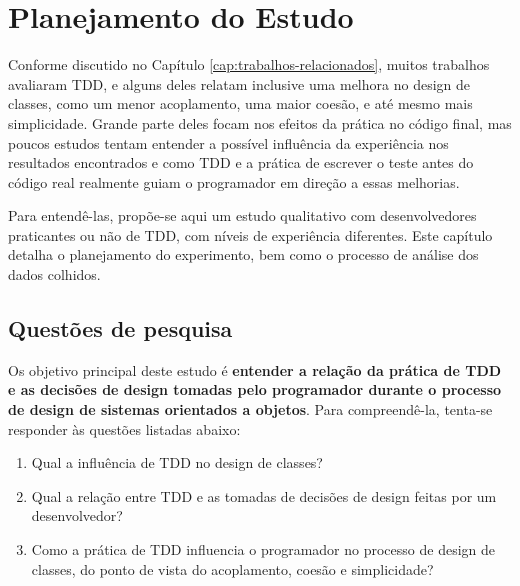 \chapter{Planejamento do Estudo}
\label{cap:planejamento}

Conforme discutido no Capítulo \ref{cap:trabalhos-relacionados}, muitos 
trabalhos avaliaram TDD, e alguns deles relatam inclusive uma melhora
no design de classes, como um menor acoplamento, uma maior coesão, e até mesmo
mais simplicidade. 
Grande parte deles focam nos efeitos da prática
no código final, mas poucos estudos tentam entender a possível influência da experiência
nos resultados encontrados e como TDD e a
prática de escrever o teste antes do código real realmente guiam o programador 
em direção a essas melhorias.

Para entendê-las, propõe-se aqui um estudo qualitativo com 
desenvolvedores praticantes ou não de TDD, com níveis de experiência diferentes.
Este capítulo detalha o planejamento do experimento, 
bem como o processo de análise dos dados colhidos.

\section{Questões de pesquisa}

Os objetivo principal deste estudo é \textbf{entender a relação da prática de TDD 
e as decisões de design tomadas pelo programador durante o processo de 
design de sistemas orientados a objetos}.
Para compreendê-la, tenta-se responder às questões listadas
abaixo:

\begin{enumerate}

	\item Qual a influência de TDD no design de classes?

	\item Qual a relação entre TDD e as tomadas de decisões de design
	feitas por um desenvolvedor?

	\item Como a prática de TDD influencia o programador no processo de  
	design de classes, do ponto de vista do acoplamento, coesão e simplicidade?

\end{enumerate}

